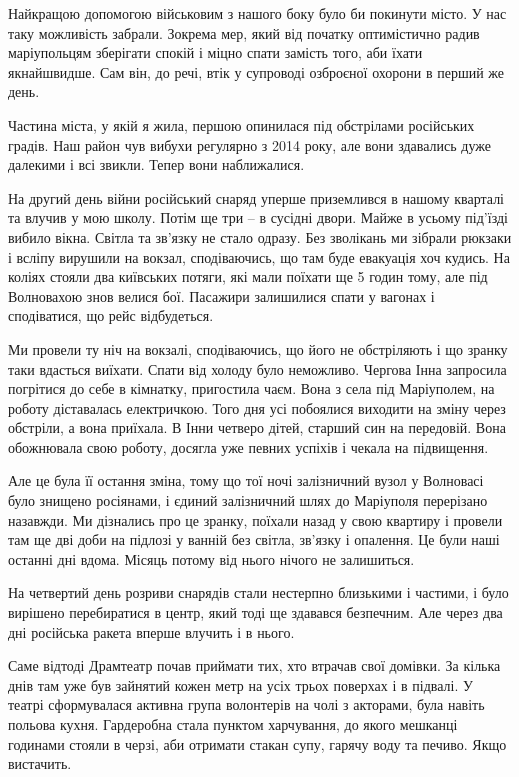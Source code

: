 Найкращою допомогою військовим з нашого боку було би покинути місто. У нас таку
можливість забрали. Зокрема мер, який від початку оптимістично радив
маріупольцям зберігати спокій і міцно спати замість того, аби їхати
якнайшвидше. Сам він, до речі, втік у супроводі озброєної охорони в перший же
день.

Частина міста, у якій я жила, першою опинилася під обстрілами російських
градів. Наш район чув вибухи регулярно з 2014 року, але вони здавались дуже
далекими і всі звикли. Тепер вони наближалися. 

На другий день війни російський снаряд уперше приземлився в нашому кварталі та влучив у мою школу. Потім ще три – в сусідні двори. Майже в усьому під'їзді вибило вікна. Світла та зв'язку не стало одразу. Без зволікань ми зібрали рюкзаки і всліпу вирушили на вокзал, сподіваючись, що там буде евакуація хоч кудись. На коліях стояли два київських потяги, які мали поїхати ще 5 годин тому, але під Волновахою знов велися бої. Пасажири залишилися спати у вагонах і сподіватися, що рейс відбудеться.

Ми провели ту ніч на вокзалі, сподіваючись, що його не обстріляють і що зранку таки вдасться виїхати. Спати від холоду було неможливо. Чергова Інна запросила погрітися до себе в кімнатку, пригостила чаєм. Вона з села під Маріуполем, на роботу діставалась електричкою. Того дня усі побоялися виходити на зміну через обстріли, а вона приїхала. В Інни четверо дітей, старший син на передовій. Вона обожнювала свою роботу, досягла уже певних успіхів і чекала на підвищення. 

Але це була її остання зміна, тому що тої ночі залізничний вузол у Волновасі було знищено росіянами, і єдиний залізничний шлях до Маріуполя перерізано назавжди. Ми дізнались про це зранку, поїхали назад у свою квартиру і провели там ще дві доби на підлозі у ванній без світла, зв'язку і опалення. Це були наші останні дні вдома. Місяць потому від нього нічого не залишиться.

На четвертий день розриви снарядів стали нестерпно близькими і частими, і було вирішено перебиратися в центр, який тоді ще здавався безпечним. Але через два дні російська ракета вперше влучить і в нього.

Саме відтоді Драмтеатр почав приймати тих, хто втрачав свої домівки. За кілька днів там уже був зайнятий кожен метр на усіх трьох поверхах і в підвалі. У театрі сформувалася активна група волонтерів на чолі з акторами, була навіть польова кухня. Гардеробна стала пунктом харчування, до якого мешканці годинами стояли в черзі, аби отримати стакан супу, гарячу воду та печиво. Якщо вистачить. 

